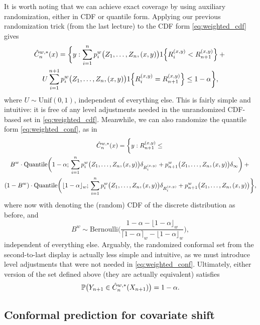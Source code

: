 \documentclass{article}
\begin{document}
It is worth noting that we can achieve exact coverage by using auxiliary
randomization, either in CDF or quantile form. Applying our previous
randomization trick (from the last lecture) to the CDF form
\eqref{eq:weighted_cdf} gives  
\begin{multline*}
\hat{C}_n^{w,*}(x) = \bigg\{ y : \sum_{i=1}^n p^w_i\big( Z_1,\dots,Z_n,(x,y)
\big) 1\Big\{ R_i^{(x,y)} < R^{(x,y)}_{n+1} \Big\} +{} \\ U \sum_{i=1}^{n+1} 
p^w_i\big( Z_1,\dots,Z_n,(x,y) \big) 1\Big\{ R_i^{(x,y)} = R^{(x,y)}_{n+1}
\Big\} \leq 1-\alpha \bigg\},
\end{multline*}
where $U \sim \mathrm{Unif}(0,1)$, independent of everything else. This is
fairly simple and intuitive: it is free of any level adjustments needed in the
unrandomized CDF-based set in \eqref{eq:weighted_cdf}. Meanwhile, we can also
randomize the quantile form \eqref{eq:weighted_conf}, as in   
\begin{multline*}
\hat{C}^{w,*}_n(x) = \bigg\{ y : R_{n+1}^{(x,y)} \leq {} \\
B^w \cdot \mathrm{Quantile}\bigg( 1-\alpha; \, \sum_{i=1}^n p^w_i\big(
Z_1,\dots,Z_n,(x,y) \big) \delta_{R_i^{(x,y)}} + p^w_{n+1}\big(
Z_1,\dots,Z_n,(x,y) \big) \delta_\infty \bigg) +{} \\ 
(1-B^w) \cdot \mathrm{Quantile}\bigg( \lfloor 1-\alpha \rfloor_w; \, 
\sum_{i=1}^n p^w_i\big( Z_1,\dots,Z_n,(x,y) \big) \delta_{R_i^{(x,y)}} +
p^w_{n+1}\big( Z_1,\dots,Z_n,(x,y) \big) \bigg\},     
\end{multline*}
where now  with 
denoting the (random) CDF of the discrete distribution  as before, and  
\[
B^w \sim \mathrm{Bernoulli}\bigg( \frac{1-\alpha - \lfloor 1-\alpha \rfloor_w}
{\lceil 1-\alpha \rceil_w - \lfloor 1-\alpha \rfloor_w} \bigg),
\]
independent of everything else. Arguably, the randomized conformal set from 
the second-to-last display is actually less simple and intuitive, as we must
introduce level adjustments that were not needed in
\eqref{eq:weighted_conf}. Ultimately, either version of the set
 defined above (they are actually equivalent) satisfies        
\[
\mathbb{P}\big( Y_{n+1} \in \hat{C}^{w,*}_n(X_{n+1}) \big) = 1-\alpha.  
\]

\subsection{Conformal prediction for covariate shift}
\end{document}
